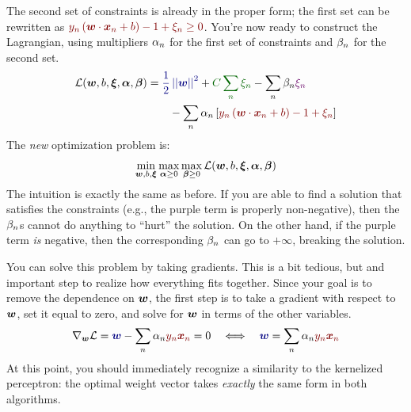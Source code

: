 The second set of constraints is already in the proper form; the first
set can be rewritten as $\textcolor{darkred}{y_n \left(
    \dotp{\vw}{\vx_n} + b \right) - 1 + \xi_n \geq 0}$.  You're now
ready to construct the Lagrangian, using multipliers $\alpha_n$ for the
first set of constraints and $\beta_n$ for the second set.
%
\begin{align}
\cL(\vw,b,\vec\xi,\vec\al,\vec\be)
&= 
  \textcolor{darkblue}{\frac 1 2 \norm{\vw}^2}
+ \textcolor{darkergreen}{C \sum_n \xi_n}
- \sum_n \be_n \textcolor{darkpurple}{\xi_n}
\\&\qquad
- \sum_n \al_n \left[
    \textcolor{darkred}{y_n \left( \dotp{\vw}{\vx_n} + b \right) - 1 + \xi_n}
  \right] 
\end{align}
%
The \emph{new} optimization problem is:
%
\begin{align}
\min_{{\boldsymbol{w}},b,\boldsymbol{\xi}} \max_{\boldsymbol{\alpha} \geq 0} \max_{\boldsymbol{\beta} \geq 0} \mathcal{L}({\boldsymbol{w}},b,\boldsymbol{\xi},\boldsymbol{\alpha},\boldsymbol{\beta})
\end{align}
%
The intuition is exactly the same as before.  If you are able to find
a solution that satisfies the constraints (e.g., the purple term is
properly non-negative), then the $\beta_n$s cannot do anything to
``hurt'' the solution.  On the other hand, if the purple term
\emph{is} negative, then the corresponding $\beta_n$ can go to
$+\infty$, breaking the solution.

You can solve this problem by taking gradients.  This is a bit
tedious, but and important step to realize how everything fits
together.  Since your goal is to remove the dependence on ${\boldsymbol{w}}$, the
first step is to take a gradient with respect to ${\boldsymbol{w}}$, set it equal
to zero, and solve for ${\boldsymbol{w}}$ in terms of the other variables.
%
\begin{align}
\grad_{\vw} \cL
= \textcolor{darkblue}{\vw} 
  - \sum_n \al_n \textcolor{darkred}{y_n \vx_n}
= 0 \quad\Longleftrightarrow\quad
\textcolor{darkblue}{\vw} 
= \sum_n \al_n \textcolor{darkred}{y_n \vx_n}
\end{align}
%
At this point, you should immediately recognize a similarity to the
kernelized perceptron: the optimal weight vector takes \emph{exactly}
the same form in both algorithms.

